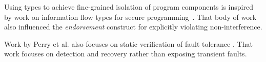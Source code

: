 Using types to achieve fine-grained isolation of program
components is inspired by work on information flow types for secure
programming~\cite{infflow-survey,jif}. That body of work also influenced
the \emph{endorsement} construct for explicitly violating
non-interference.

Work by Perry et al. also focuses on static verification of fault tolerance
\cite{perry-pldi,perry-sas}. That work focuses on detection and
recovery rather than exposing transient faults.


%
%
%
%
%
%
%


